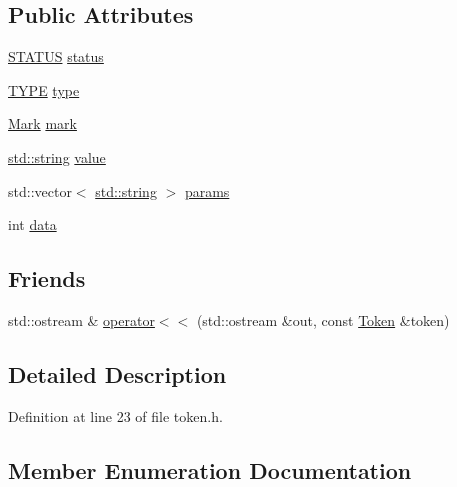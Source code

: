 \subsection*{Public Attributes}
\begin{DoxyCompactItemize}
\item 
\mbox{\hyperlink{struct_y_a_m_l_1_1_token_af37af1a3129a5f1c36f08d41f668f7e5}{S\+T\+A\+T\+US}} \mbox{\hyperlink{struct_y_a_m_l_1_1_token_a32ffa6eef8b549f2cd2b566dc399d219}{status}}
\item 
\mbox{\hyperlink{struct_y_a_m_l_1_1_token_a60bcc6615b60f00ae9bce3aaeebf6d14}{T\+Y\+PE}} \mbox{\hyperlink{struct_y_a_m_l_1_1_token_a0c2fb43511afadcfcd0169bfc4838cf6}{type}}
\item 
\mbox{\hyperlink{struct_y_a_m_l_1_1_mark}{Mark}} \mbox{\hyperlink{struct_y_a_m_l_1_1_token_aba98ab67567c733fd1f9c792d0d819d6}{mark}}
\item 
\mbox{\hyperlink{glad_8h_ac83513893df92266f79a515488701770}{std\+::string}} \mbox{\hyperlink{struct_y_a_m_l_1_1_token_a95b3680bf58a94bd7b9b2dca41dc0fd9}{value}}
\item 
std\+::vector$<$ \mbox{\hyperlink{glad_8h_ac83513893df92266f79a515488701770}{std\+::string}} $>$ \mbox{\hyperlink{struct_y_a_m_l_1_1_token_a15b0ad4a1c7f27f5284a48216f7c3464}{params}}
\item 
int \mbox{\hyperlink{struct_y_a_m_l_1_1_token_a858351d3136d14fcacd890f4974da8b2}{data}}
\end{DoxyCompactItemize}
\subsection*{Friends}
\begin{DoxyCompactItemize}
\item 
std\+::ostream \& \mbox{\hyperlink{struct_y_a_m_l_1_1_token_a9209854573e66d53ab24a5915e2f6638}{operator$<$$<$}} (std\+::ostream \&out, const \mbox{\hyperlink{struct_y_a_m_l_1_1_token}{Token}} \&token)
\end{DoxyCompactItemize}


\subsection{Detailed Description}


Definition at line 23 of file token.\+h.



\subsection{Member Enumeration Documentation}
\mbox{\label{struct_y_a_m_l_1_1_token_af37af1a3129a5f1c36f08d41f668f7e5}} 
